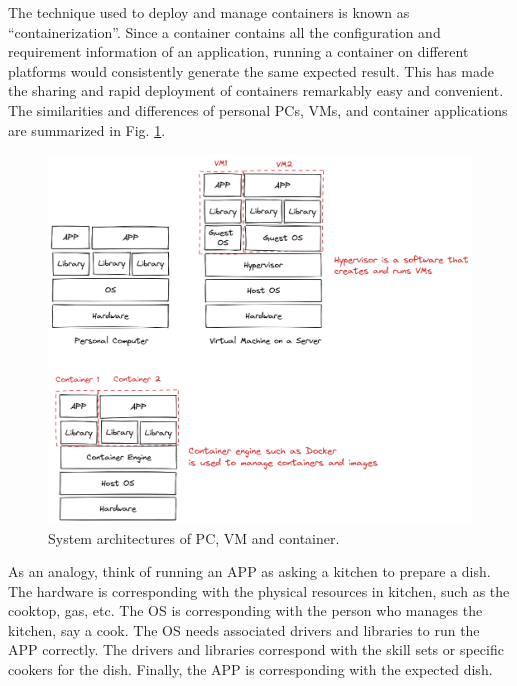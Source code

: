 The technique used to deploy and manage containers is known as ``containerization''. Since a container contains all the configuration and requirement information of an application, running a container on different platforms would consistently generate the same expected result. This has made the sharing and rapid deployment of containers remarkably easy and convenient. The similarities and differences of personal PCs, VMs, and container applications are summarized in Fig. \ref{ch:vac:fig:pcvmcontainersructure}.

\begin{figure}
	\centering
	\includegraphics[width=350pt]{chapters/ch-virtualization-and-containerization/figures/pcvmcontainerstructure.png}
	\caption{System architectures of PC, VM and container.} \label{ch:vac:fig:pcvmcontainersructure}
\end{figure}

As an analogy, think of running an APP as asking a kitchen to prepare a dish. The hardware is corresponding with the physical resources in kitchen, such as the cooktop, gas, etc. The OS is corresponding with the person who manages the kitchen, say a cook. The OS needs associated drivers and libraries to run the APP correctly. The drivers and libraries correspond with the skill sets or specific cookers for the dish. Finally, the APP is corresponding with the expected dish.

